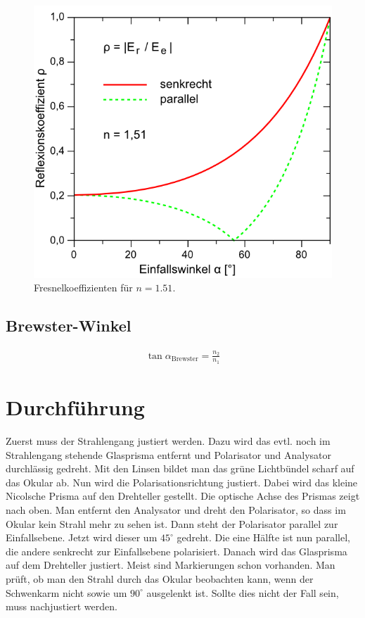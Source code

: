 \documentclass[12pt,a4paper,titlepage,headinclude,bibtotoc]{scrartcl}
\begin{document}
\begin{figure}[!h]
	\centering
	\includegraphics[scale=0.7]{fresnelkoeff.png}
	\caption{Fresnelkoeffizienten für $n=1.51$. \cite[Datum: 23.03.2015]{LP20}}
	\label{fig:fresnelkoeff}
\end{figure}

\subsection{Brewster-Winkel}
\begin{align}
	\tan\alpha_\text{Brewster}=\frac{n_2}{n_1}
\end{align}

\section{Durchführung}
\label{sec:durchfuehrung}
Zuerst muss der Strahlengang justiert werden.
Dazu wird das evtl. noch im Strahlengang stehende Glasprisma entfernt und Polarisator und Analysator durchlässig gedreht.
Mit den Linsen bildet man das grüne Lichtbündel scharf auf das Okular ab.
Nun wird die Polarisationsrichtung justiert.
Dabei wird das kleine Nicolsche Prisma auf den Drehteller gestellt.
Die optische Achse des Prismas zeigt nach oben.
Man entfernt den Analysator und dreht den Polarisator, so dass im Okular kein Strahl mehr zu sehen ist.
Dann steht der Polarisator parallel zur Einfallsebene.
Jetzt wird dieser um $45^\circ$ gedreht.
Die eine Hälfte ist nun parallel, die andere senkrecht zur Einfallsebene polarisiert.
Danach wird das Glasprisma auf dem Drehteller justiert.
Meist sind Markierungen schon vorhanden.
Man prüft, ob man den Strahl durch das Okular beobachten kann, wenn der Schwenkarm nicht sowie um $90^\circ$ ausgelenkt ist.
Sollte dies nicht der Fall sein, muss nachjustiert werden.\\
\end{document}
